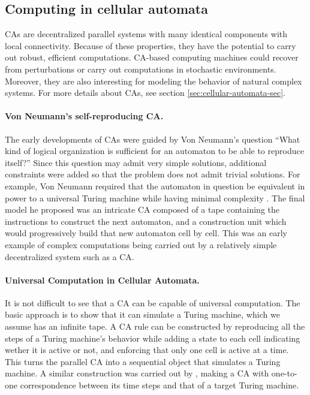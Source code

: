 \subsection{Computing in cellular automata}\label{sec:comp-cell-autom}

\Acfp{CA} are decentralized parallel systems with many identical components with
local connectivity. Because of these properties, they have the potential to
carry out robust, efficient computations. \ac{CA}-based computing machines could
recover from perturbations or carry out computations in stochastic environments.
Moreover, they are also interesting for modeling the behavior of natural complex
systems. For more details about \acp{CA}, see section
\ref{sec:cellular-automata-sec}.

\paragraph{Von Neumann's self-reproducing \ac{CA}.}
The early developments of \acp{CA} were guided by Von Neumann's question ``What
kind of logical organization is sufficient for an automaton to be able to
reproduce itself?'' Since this question may admit very simple solutions,
additional constraints were added so that the problem does not admit trivial
solutions. For example, Von Neumann required that the automaton in question be
equivalent in power to a universal Turing machine while having minimal
complexity \parencite{vonneumannTheorySelfreproducingAutomata1966}. The final
model he proposed was an intricate \ac{CA} composed of a tape containing the
instructions to construct the next automaton, and a construction unit which
would progressively build that new automaton cell by cell. This was an early
example of complex computations being carried out by a relatively simple
decentralized system such as a \ac{CA}.

\paragraph{Universal Computation in Cellular Automata.}
It is not difficult to see that a \ac{CA} can be capable of universal
computation. The basic approach is to show that it can simulate a Turing
machine, which we assume has an infinite tape. A \ac{CA} rule can be constructed
by reproducing all the steps of a Turing machine's behavior while adding a state
to each cell indicating wether it is active or not, and enforcing that only one
cell is active at a time. This turns the parallel \ac{CA} into a sequential
object that simulates a Turing machine. A similar construction was carried out
by \parencite{smithSimpleComputationUniversalCellular1971}, making a \ac{CA}
with one-to-one correspondence between its time steps and that of a target
Turing machine.

